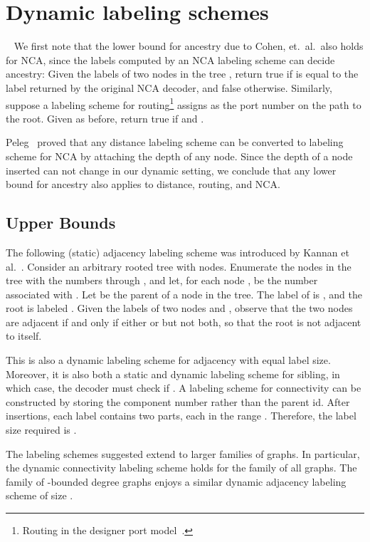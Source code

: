 \documentclass{llncs}
\newcommand{\drop}[1]{}
\begin{document}
\section{Dynamic labeling schemes}~\label{Sec:Dynamic}
We first note that the lower bound for ancestry due to Cohen, et.~al.~also
holds for NCA, since the labels computed by an NCA labeling scheme can decide ancestry:
Given the labels   of two nodes  in the tree ,  return
true if  is equal to the label returned by the original NCA decoder, and
false otherwise.
Similarly, suppose a labeling scheme for routing\footnote{Routing in the
designer port model~\cite{Fraigniaud01}.} assigns  as the port number on the
path to the root. Given    as before, return true if
 and .
\drop{If there were to exist a dynamic labeling scheme for routing or NCA with
size , the labels produced would be sufficient to determine ancestry,
in contrast to Cohen's bound.}
Peleg~\cite{Peleg05} proved that any  distance labeling scheme can be
converted to  labeling scheme for NCA by  attaching the
depth of any node. Since the depth of a node inserted can not change in our
dynamic setting, we conclude that any lower
bound for ancestry also applies to distance, routing, and NCA.

\subsection{ Upper Bounds} \label{sec:upper-bounds-dynamic}
The following (static) adjacency labeling scheme was introduced by Kannan et al.~\cite{Kannan92}.
Consider an arbitrary rooted tree  with  nodes.
Enumerate the nodes in the tree with the numbers  through , and let,
for each node ,  be the number associated with . Let  be the parent of a node  in the tree.
The label of  is , and the root is labeled
. Given the labels  of two nodes  and , observe
that the two nodes are adjacent if and only if either  or
 but not both, so that the root is not adjacent to
itself.

This is also  a dynamic labeling scheme for adjacency with equal label size.
 Moreover, it is also both a static and dynamic labeling scheme for sibling,
in which case, the decoder must check if .
 A labeling scheme for connectivity can be constructed by storing the
 component number rather than the parent id. After  insertions, each label contains two parts, each in the range
 .  Therefore, the label size required is .

The labeling schemes suggested extend to larger families of graphs.
In particular, the dynamic connectivity labeling scheme  holds  for the family of all graphs.
The family of -bounded degree graphs enjoys a similar dynamic adjacency labeling scheme of size .
\end{document}
